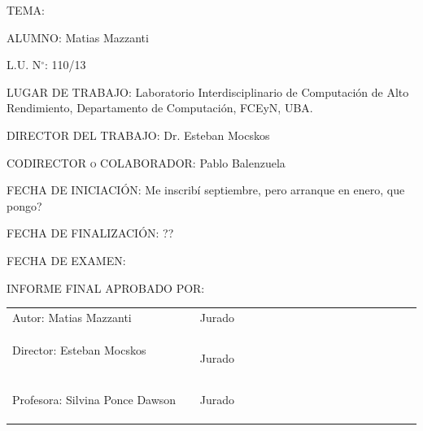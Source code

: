 \documentclass[11pt,twoside, spanish]{report} %
\begin{document}
\begin{center}
	\raggedright
	\textsc{TEMA:}

	\bigskip

	\textsc{ALUMNO:} Matias Mazzanti

	\bigskip

	\textsc{L.U. N$^{\circ}$:} 110/13

	\bigskip

	\textsc{LUGAR DE TRABAJO:} Laboratorio Interdisciplinario de Computaci\'on de
	Alto Rendimiento, Departamento de Computaci\'on, FCEyN, UBA.


	\bigskip

	\textsc{DIRECTOR DEL TRABAJO:} Dr. Esteban Mocskos

	\bigskip

	\textsc{CODIRECTOR o COLABORADOR:} Pablo Balenzuela

	\bigskip

	\textsc{FECHA DE INICIACI\'ON:} Me inscrib\'i septiembre, pero arranque en enero, que pongo?

	\bigskip

	\textsc{FECHA DE FINALIZACI\'ON:} ??

	\bigskip

	{\large FECHA DE EXAMEN: }

	\bigskip

	\textsc{INFORME FINAL APROBADO POR:}
	\vfill

	\begin{center}
		\begin{tabular}{lll}
			\cline{1-1}\cline{1-1}\cline{3-3}\cline{3-3}%
			Autor: Matias Mazzanti  & \hspace{2cm} & Jurado\ \ \ \ \ \ \ \ \ \ \ \ \ \ \
			\ \ \ \ \ \ \ \ \ \ \ \ \ \ \ \  \\
			&& \\
			&& \\
			&& \\
			\cline{1-1}\cline{1-1}\cline{3-3}\cline{3-3}%
			Director: Esteban Mocskos \ \ \ \ \ \ \ \ \ \ \ \ \  & \hspace{2cm} & Jurado\\
			&& \\
			&& \\
			&& \\
			\cline{1-1}\cline{1-1}\cline{3-3}\cline{3-3}%
			Profesora: Silvina Ponce Dawson  & \hspace{2cm} & Jurado\\
			&& \\
			&& \\
			&& \\
		\end{tabular}
	\end{center}

\end{center}
\end{document}
